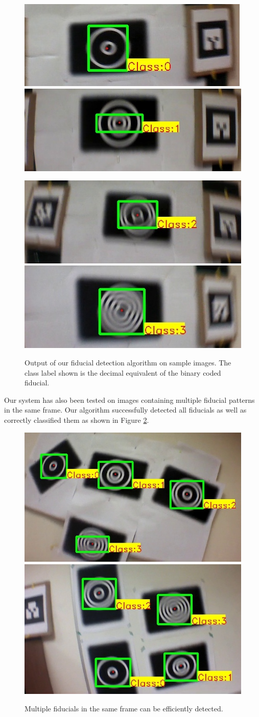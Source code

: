 \begin{figure}[h!]
\centering
  \includegraphics[width=0.4\linewidth]{figures/fiducial/output_00.jpg}
  \includegraphics[width=0.4\linewidth]{figures/fiducial/output_01.jpg}

  \includegraphics[width=0.4\linewidth]{figures/fiducial/output_10.jpg}
  \includegraphics[width=0.4\linewidth]{figures/fiducial/output_11.jpg}
  \caption[Output of our fiducial detection algorithm]{Output of our fiducial
  detection algorithm on sample images. The class label shown is the decimal
  equivalent of the binary coded fiducial.}
  \label{fig:out_outputs}
\end{figure}

Our system has also been tested on images containing multiple fiducial
patterns in the same frame. Our algorithm successfully detected
all fiducials as well as correctly classified them as shown in
Figure \ref{fig:output_all}.

\begin{figure}[ht!]
\centering
  \includegraphics[width=.45\linewidth]{figures/fiducial/output_all_2.jpg}
  \includegraphics[width=.45\linewidth]{figures/fiducial/output_test_all1.jpg}
  \caption[Result: Multiple Fiducials Detection]{Multiple fiducials in the same
  frame can be efficiently detected. }
  \label{fig:output_all}
\end{figure}

